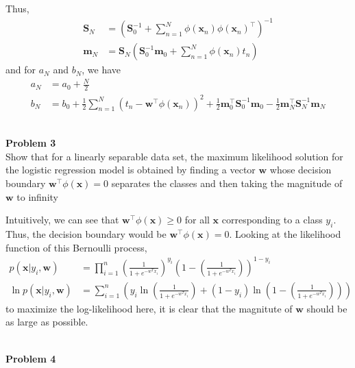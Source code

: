 \documentclass{article}
\begin{document}
\begin{sol}
    Thus,
    \begin{align*}
        \mathbf{S}_N &= \left(\mathbf{S}_0^{-1} + \sum_{n=1}^N \phi(\mathbf{x}_n)\phi(\mathbf{x}_n)^\top\right)^{-1}\\
        \mathbf{m}_N &= \mathbf{S}_N\left(\mathbf{S}_0^{-1}\mathbf{m}_0 + \sum_{n=1}^N \phi(\mathbf{x}_n)t_n\right)
    \end{align*}
    and for $a_N$ and $b_N$, we have
    \begin{align*}
        a_N &= a_0 + \frac{N}{2}\\
        b_N &= b_0 + \frac{1}{2}\sum_{n=1}^N\left(t_n - \mathbf{w}^\top\phi(\mathbf{x}_n)\right)^2 + \frac{1}{2}\mathbf{m}_0^\top\mathbf{S}_0^{-1}\mathbf{m}_0 - \frac{1}{2}\mathbf{m}_N^\top\mathbf{S}_N^{-1}\mathbf{m}_N
    \end{align*}
\end{sol}
\color{black}
\leavevmode\\
\noindent
\Large{\textbf{Problem 3}}\normalsize
\\

Show  that  for  a  linearly  separable  data  set,  the  maximum  likelihood  solution  for  the  logistic 
regression model is obtained by finding a vector $\mathbf{w}$ whose decision boundary $\mathbf{w}^\top\phi(\mathbf{x}) = 0$ separates the 
classes and then taking the magnitude of $\mathbf{w}$ to infinity 
\color{blue}
\begin{sol}
   Intuitively, we can see that $\mathbf{w}^\top\phi(\mathbf{x}) \geq 0$ for all $\mathbf{x}$ corresponding to a class $y_i$. Thus, the decision boundary would be $\mathbf{w}^{\top} \phi(\mathbf{x}) = 0$. Looking at the likelihood function of this Bernoulli process,
    \begin{align*}
        p(\mathbf{x}|y_i,\mathbf{w}) &= \prod_{i=1}^{n} \left(\frac{1}{1 + e^{-w^T x_i}}\right)^{y_i} \left(1 - \left(\frac{1}{1 + e^{-w^T x_i}}\right)\right)^{1-y_i}\\
        \ln p(\mathbf{x}|y_i,\mathbf{w}) &= \sum_{i=1}^{n} \left(y_i\ln\left(\frac{1}{1 + e^{-w^T x_i}}\right) + (1-y_i)\ln\left(1 - \left(\frac{1}{1 + e^{-w^T x_i}}\right)\right)\right)
    \end{align*}
    to maximize the log-likelihood here, it is clear that the magnitute of $\mathbf{w}$ should be as large as possible.
\end{sol}
\color{black}
\leavevmode\\
\noindent
\Large{\textbf{Problem 4}}\normalsize
\\
\end{document}
